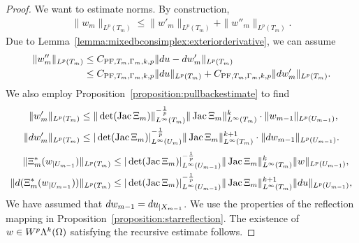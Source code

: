 \documentclass[10pt,a4paper]{article}
\begin{document}
\begin{proof}
    We want to estimate norms. 
    By construction,
    \begin{align*}
        \| w_{m} \|_{L^{p}(T_{m})}
        \leq  
        \| w'_{m} \|_{L^{p}(T_{m})}
        + 
        \| w''_{m} \|_{L^{p}(T_{m})}
        .
    \end{align*}
    Due to Lemma~\ref{lemma:mixedbconsimplex:exteriorderivative},
    we can assume 
    \begin{align*}
        \| w''_{m} \|_{L^{p}(T_{m})} 
        &
        \leq 
        C_{{\rm PF},T_{m},\Gamma_{m},k,p} \| d u - d w'_{m} \|_{L^{p}(T_{m})}
        \\&
        \leq 
        C_{{\rm PF},T_{m},\Gamma_{m},k,p} \| d u      \|_{L^{p}(T_{m})} 
        + 
        C_{{\rm PF},T_{m},\Gamma_{m},k,p} \| d w'_{m} \|_{L^{p}(T_{m})} 
        .
    \end{align*}
    We also employ Proposition~\ref{proposition:pullbackestimate} to find 
    \begin{align*}
        \| w'_{m} \|_{L^{p}(T_{m})}
        &\leq 
        \|\det(\operatorname{{\rm Jac}} \Xi_{m}  )\|_{L^{\infty}(T_{m})}^{-\frac 1 p} 
        \| \operatorname{{\rm Jac}} \Xi_{m} \|_{L^{\infty}(T_{m})}^{k}
        \cdot 
        \| w_{m-1} \|_{L^{p}(U_{m-1})}
        ,
        \\
        \| d w'_{m} \|_{L^{p}(T_{m})}
        &\leq 
        |\det(\operatorname{{\rm Jac}} \Xi_{m}  )|^{-\frac 1 p}_{L^{\infty}(U_{m})} 
        \| \operatorname{{\rm Jac}} \Xi_{m} \|_{L^{\infty}(T_{m})}^{k+1}
        \cdot 
        \| d w_{m-1} \|_{L^{p}(U_{m-1})}
        .
    \end{align*}
    \begin{align*}
        \| \Xi_{m}^{\ast}(w_{|U_{m-1}}) \|_{L^{p}(T_{m})}
        &\leq 
        |\det(\operatorname{{\rm Jac}} \Xi_{m}  )|^{-\frac 1 p}_{L^{\infty}(U_{m-1})} 
        \| \operatorname{{\rm Jac}} \Xi_{m} \|^{k}_{L^{\infty}(T_{m})}
        \| w \|_{L^{p}(U_{m-1})}
        ,
        \\
        \| d (\Xi_{m}^{\ast}(w_{|U_{m-1}})) \|_{L^{p}(T_{m})}
        &\leq 
        |\det(\operatorname{{\rm Jac}} \Xi_{m}  )|^{-\frac 1 p}_{L^{\infty}(U_{m-1})} 
        \| \operatorname{{\rm Jac}} \Xi_{m} \|^{k+1}_{L^{\infty}(T_{m})}
        \| d u \|_{L^{p}(U_{m-1})}
        ,
    \end{align*}
    We have assumed that $d w_{m-1} = d u_{|X_{m-1}}$. 
    We use the properties of the reflection mapping in Proposition~\ref{proposition:starreflection}. 
    The existence of $w \in W^{p}\Lambda^{k}(\Omega)$ satisfying the recursive estimate follows. 
\end{proof}
\end{document}
